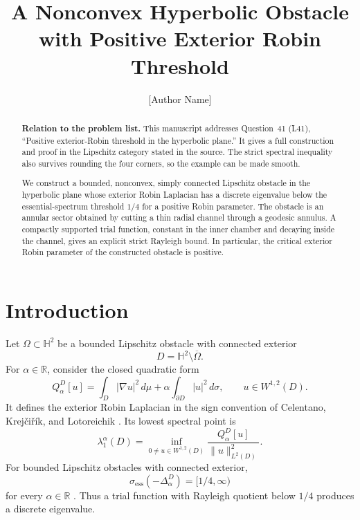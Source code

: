 \documentclass[11pt]{article}
\title{A Nonconvex Hyperbolic Obstacle with Positive Exterior Robin Threshold}
\author{[Author Name]}
\date{}
\theoremstyle{remark}
\begin{document}
\maketitle

\begin{abstract}
\textbf{Relation to the problem list.}
This manuscript addresses Question~41 (L41), ``Positive exterior-Robin
threshold in the hyperbolic plane.''  It gives a full construction and proof
in the Lipschitz category stated in the source.  The strict spectral
inequality also survives rounding the four corners, so the example can be
made smooth.

We construct a bounded, nonconvex, simply connected Lipschitz obstacle in
the hyperbolic plane whose exterior Robin Laplacian has a discrete eigenvalue
below the essential-spectrum threshold $1/4$ for a positive Robin parameter.
The obstacle is an annular sector obtained by cutting a thin radial channel
through a geodesic annulus.  A compactly supported trial function, constant
in the inner chamber and decaying inside the channel, gives an explicit
strict Rayleigh bound.  In particular, the critical exterior Robin
parameter of the constructed obstacle is positive.
\end{abstract}

\section{Introduction}

Let $\Omega\subset\mathbb H^2$ be a bounded Lipschitz obstacle with
connected exterior
\[
 D=\mathbb H^2\setminus\overline\Omega.
\]
For $\alpha\in\mathbb R$, consider the closed quadratic form
\begin{equation}\label{eq:form}
 Q_\alpha^D[u]
 =\int_D|\nabla u|^2\,d\mu
 +\alpha\int_{\partial D}|u|^2\,d\sigma,
 \qquad u\in W^{1,2}(D).
\end{equation}
It defines the exterior Robin Laplacian in the sign convention of
Celentano, Krej\v{c}i\v{r}\'{i}k, and Lotoreichik \cite{CKL}.  Its lowest
spectral point is
\begin{equation}\label{eq:rayleigh}
 \lambda_1^\alpha(D)
 =\inf_{0\ne u\in W^{1,2}(D)}
 \frac{Q_\alpha^D[u]}{\|u\|_{L^2(D)}^2}.
\end{equation}
For bounded Lipschitz obstacles with connected exterior,
\begin{equation}\label{eq:ess}
 \sigma_{\mathrm{ess}}(-\Delta_\alpha^D)=[1/4,\infty)
\end{equation}
for every $\alpha\in\mathbb R$ \cite[Proposition~3.4]{CKL}.  Thus a trial
function with Rayleigh quotient below $1/4$ produces a discrete eigenvalue.
\end{document}
